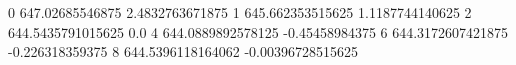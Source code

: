 0 647.02685546875 2.4832763671875
1 645.662353515625 1.1187744140625
2 644.5435791015625 0.0
4 644.0889892578125 -0.45458984375
6 644.3172607421875 -0.226318359375
8 644.5396118164062 -0.00396728515625
